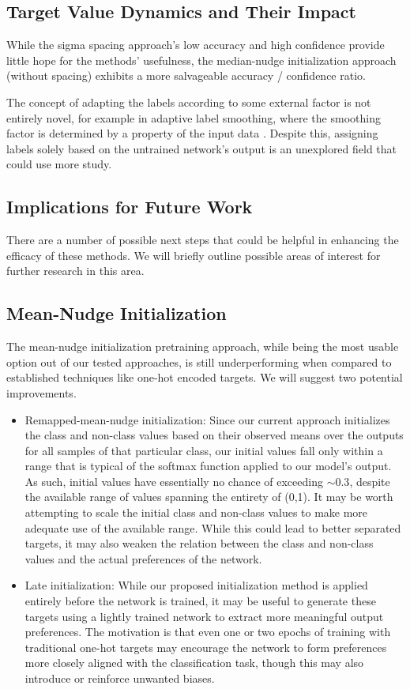 \documentclass[12pt,fleqn,a4paper]{article}
\begin{document}
\subsection{Target Value Dynamics and Their Impact}
While the sigma spacing approach's low accuracy and high confidence provide little hope for the methods' usefulness, the median-nudge initialization approach (without spacing) exhibits a more salvageable accuracy / confidence ratio.

The concept of adapting the labels according to some external factor is not entirely novel, for example in adaptive label smoothing, where the smoothing factor is determined by a property of the input data \cite{krothapalli_adaptive_2020}. Despite this, assigning labels solely based on the untrained network's output is an unexplored field that could use more study. 

\subsection{Implications for Future Work}
There are a number of possible next steps that could be helpful in enhancing the efficacy of these methods. We will briefly outline possible areas of interest for further research in this area.

\subsection{Mean-Nudge Initialization}
The mean-nudge initialization pretraining approach, while being the most usable option out of our tested approaches, is still underperforming when compared to established techniques like one-hot encoded targets. We will suggest two potential improvements.
\begin{itemize}
    \item Remapped-mean-nudge initialization: Since our current approach initializes the class and non-class values based on their observed means over the outputs for all samples of that particular class, our initial values fall only within a range that is typical of the softmax function applied to our model's output. As such, initial values have essentially no chance of exceeding $\sim 0.3$, despite the available range of values spanning the entirety of (0,1). It may be worth attempting to scale the initial class and non-class values to make more adequate use of the available range. While this could lead to better separated targets, it may also weaken the relation between the class and non-class values and the actual preferences of the network.
    \item Late initialization: While our proposed initialization method is applied entirely before the network is trained, it may be useful to generate these targets using a lightly trained network to extract more meaningful output preferences. The motivation is that even one or two epochs of training with traditional one-hot targets may encourage the network to form preferences more closely aligned with the classification task, though this may also introduce or reinforce unwanted biases.
\end{itemize}
\end{document}
